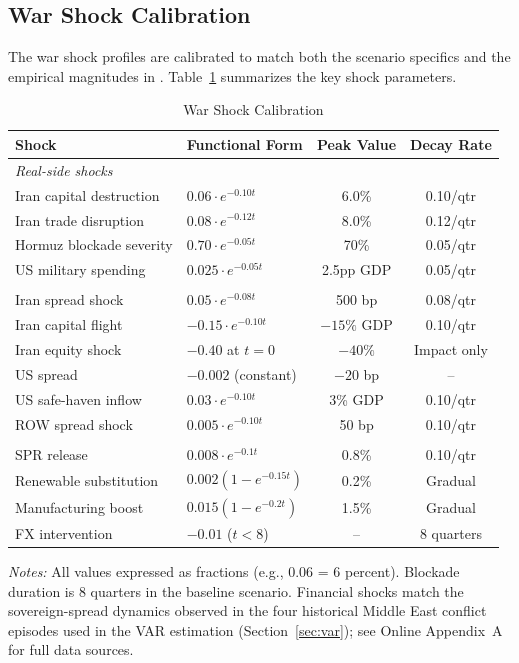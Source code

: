 \documentclass[12pt]{article}
\begin{document}
\subsection{War Shock Calibration}

The war shock profiles are calibrated to match both the scenario specifics and the empirical magnitudes in \citet{federle2026price}. Table~\ref{tab:shocks} summarizes the key shock parameters.

\begin{table}[H]
\centering
\small
\begin{threeparttable}
\caption{War Shock Calibration}
\label{tab:shocks}
\begin{tabular}{@{}llcc@{}}
\toprule
Shock & Functional Form & Peak Value & Decay Rate \\
\midrule
\multicolumn{4}{l}{\textit{Real-side shocks}} \\
Iran capital destruction & $0.06 \cdot e^{-0.10t}$ & 6.0\% & 0.10/qtr \\
Iran trade disruption & $0.08 \cdot e^{-0.12t}$ & 8.0\% & 0.12/qtr \\
Hormuz blockade severity & $0.70 \cdot e^{-0.05t}$ & 70\% & 0.05/qtr \\
US military spending & $0.025 \cdot e^{-0.05t}$ & 2.5pp GDP & 0.05/qtr \\
\addlinespace
\multicolumn{4}{l}{\textit{Financial shocks}} \\
Iran spread shock & $0.05 \cdot e^{-0.08t}$ & 500 bp & 0.08/qtr \\
Iran capital flight & $-0.15 \cdot e^{-0.10t}$ & $-15\%$ GDP & 0.10/qtr \\
Iran equity shock & $-0.40$ at $t=0$ & $-40\%$ & Impact only \\
US spread & $-0.002$ (constant) & $-20$ bp & -- \\
US safe-haven inflow & $0.03 \cdot e^{-0.10t}$ & 3\% GDP & 0.10/qtr \\
ROW spread shock & $0.005 \cdot e^{-0.10t}$ & 50 bp & 0.10/qtr \\
\addlinespace
\multicolumn{4}{l}{\textit{China stabilization}} \\
SPR release & $0.008 \cdot e^{-0.1t}$ & 0.8\% & 0.10/qtr \\
Renewable substitution & $0.002(1-e^{-0.15t})$ & 0.2\% & Gradual \\
Manufacturing boost & $0.015(1-e^{-0.2t})$ & 1.5\% & Gradual \\
FX intervention & $-0.01$ ($t < 8$) & -- & 8 quarters \\
\bottomrule
\end{tabular}
\begin{tablenotes}[flushleft]
\small
\item \textit{Notes:} All values expressed as fractions (e.g., 0.06 = 6 percent). Blockade duration is 8 quarters in the baseline scenario. Financial shocks match the sovereign-spread dynamics observed in the four historical Middle East conflict episodes used in the VAR estimation (Section~\ref{sec:var}); see Online Appendix~A for full data sources.
\end{tablenotes}
\end{threeparttable}
\end{table}
\end{document}
